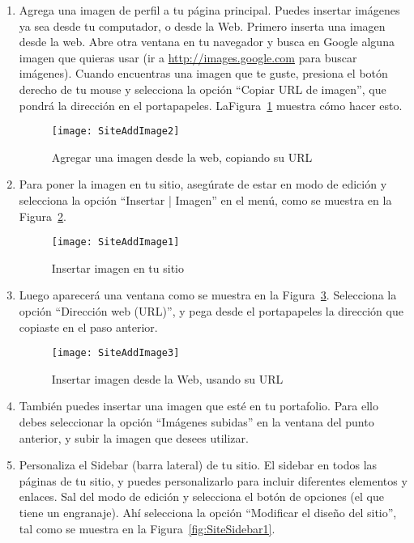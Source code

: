 \begin{enumerate}
\item Agrega una imagen de perfil a tu página principal. Puedes insertar imágenes ya sea desde tu computador, o desde la Web. Primero inserta una imagen desde la web. Abre otra ventana en tu navegador y busca en Google alguna imagen que quieras usar (ir a \url{http://images.google.com} para buscar imágenes). Cuando encuentras una imagen que te guste, presiona el botón derecho de tu mouse y selecciona la opción ``Copiar URL de imagen'', que pondrá la dirección en el portapapeles. LaFigura~\ref{fig:SiteAddImage2} muestra cómo hacer esto.

  \begin{figure}[H]
    \centering
    \texttt{[image: SiteAddImage2]}
    \caption{Agregar una imagen desde la web, copiando su URL}
    \label{fig:SiteAddImage2}
  \end{figure}

\item Para poner la imagen en tu sitio, asegúrate de estar en modo de edición y selecciona la opción ``Insertar | Imagen'' en el menú, como se muestra en la Figura~\ref{fig:SiteAddImage1}.

  \begin{figure}[H]
    \centering
    \texttt{[image: SiteAddImage1]}
    \caption{Insertar imagen en tu sitio}
    \label{fig:SiteAddImage1}
  \end{figure}

\item Luego aparecerá una ventana como se muestra en la Figura~\ref{fig:SiteAddImage3}. Selecciona la opción ``Dirección web (URL)'', y pega desde el portapapeles la dirección que copiaste en el paso anterior.

  \begin{figure}[H]
    \centering
    \texttt{[image: SiteAddImage3]}
    \caption{Insertar imagen desde la Web, usando su URL}
    \label{fig:SiteAddImage3}
  \end{figure}

\item También puedes insertar una imagen que esté en tu portafolio. Para ello debes seleccionar la opción ``Imágenes subidas'' en la ventana del punto anterior, y subir la imagen que desees utilizar.

\item Personaliza el Sidebar (barra lateral) de tu sitio. El sidebar en todos las páginas de tu sitio, y puedes personalizarlo para incluir diferentes elementos y enlaces. Sal del modo de edición y selecciona el botón de opciones (el que tiene un engranaje). Ahí selecciona la opción ``Modificar el diseño del sitio'', tal como se muestra en la Figura~\ref{fig:SiteSidebar1}.


\end{enumerate}
